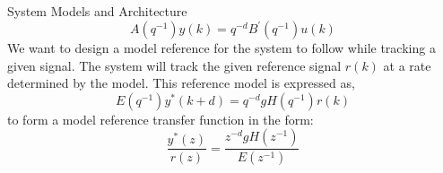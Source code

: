 \begin{section}{System Models and Architecture}
\begin{equation}
	A(q^{-1})y(k)=q^{-d}B^{'}(q^{-1})u(k)
	\end{equation}
We want to design a model reference for the system to follow while tracking a given signal. The system will track the given reference signal $r(k)$ at a rate determined by the model. This reference model is expressed as,
	\begin{equation}
	E(q^{-1})y^*(k+d)=q^{-d}gH(q^{-1})r(k)
	\end{equation}
to form a model reference transfer function in the form:
	\begin{equation}
	\frac{y^*(z)}{r(z)}=\frac{z^{-d}gH(z^{-1})}{E(z^{-1})}
	\end{equation}

\end{section}